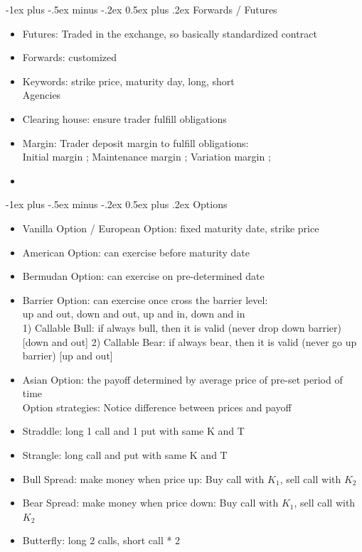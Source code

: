 \documentclass[10pt,landscape]{article}
\makeatletter
\renewcommand{\section}{\@startsection{section}{1}{0mm}%
                                {-1ex plus -.5ex minus -.2ex}%
                                {0.5ex plus .2ex}%
                                {\normalfont\large\bfseries}}
\makeatother
\begin{document}
\begin{multicols}{2}
\setlength{\premulticols}{1pt}
\setlength{\postmulticols}{1pt}
\setlength{\multicolsep}{1pt}
\setlength{\columnsep}{2pt}


\section{Forwards / Futures}
\begin{itemize}
	\item Futures: Traded in the exchange, so basically standardized contract
	\item Forwards: customized
	\item Keywords: strike price, maturity day, long, short\\
	
	Agencies
	\item Clearing house: ensure trader fulfill obligations
	\item Margin: Trader deposit margin to fulfill obligations:\\
		Initial margin ; Maintenance margin ; Variation margin ;
	\item 
	
\end{itemize}

\section{Options}
\begin{itemize}
	\item Vanilla Option / European Option: fixed maturity date, strike price
	\item American Option: can exercise before maturity date
	\item Bermudan Option: can exercise on pre-determined date
	\item Barrier Option: can exercise once cross the barrier level: \\
			up and out, down and out, up and in, down and in\\
			1) Callable Bull: if always bull, then it is valid (never drop down barrier) [down and out]
			2) Callable Bear: if always bear, then it is valid (never go up barrier) [up and out]
			
	\item Asian Option: the payoff determined by average price of pre-set period of time\\
	
	Option strategies: Notice difference between prices and payoff
	\item Straddle: long 1 call and 1 put with same K and T
	\item Strangle: long call and put with same K and T
	\item Bull Spread: make money when price up: Buy call with $K_1$, sell call with $K_2$
	\item Bear Spread: make money when price down: Buy call with $K_1$, sell call with $K_2$
	\item Butterfly: long 2 calls, short call * 2
	

\end{itemize}
\end{multicols}
\end{document}
